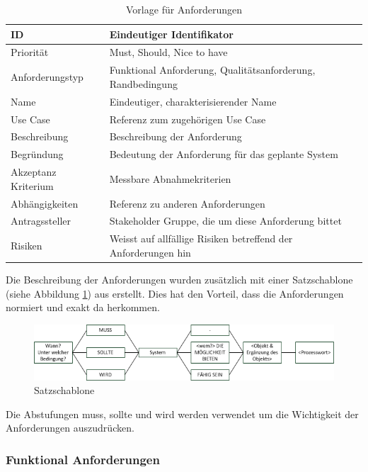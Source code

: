 \begin{table}[ht]
\centering
  \begin{tabular}{ l | p{8cm} }
	\hline
	\rowcolor{gray}
	ID 			&	Eindeutiger Identifikator\\ \hline
	Priorität 		&	Must, Should, Nice to have\\ \hline
	Anforderungstyp	&	Funktional Anforderung, Qualitätsanforderung, Randbedingung\\ \hline
	Name 			&	Eindeutiger, charakterisierender Name\\ \hline
	Use Case 		&	Referenz zum zugehörigen Use Case\\ \hline
	Beschreibung 	&	Beschreibung der Anforderung\\ \hline
	Begründung 		&	Bedeutung der Anforderung für das geplante System\\ \hline
	Akzeptanz Kriterium	&	Messbare Abnahmekriterien\\ \hline
	Abhängigkeiten 	&	Referenz zu anderen Anforderungen\\ \hline
	Antragssteller 	&	Stakeholder Gruppe, die um diese Anforderung bittet\\ \hline
	Risiken	 	&	Weisst auf allfällige Risiken betreffend der Anforderungen hin
  \end{tabular}
   \caption{Vorlage für Anforderungen}\label{table:req_template}
\end{table}


Die Beschreibung der Anforderungen wurden zusätzlich mit einer Satzschablone (siehe Abbildung \ref{fig:satzschablone}) aus \cite{req_eng_book} erstellt. Dies hat den Vorteil, dass die Anforderungen normiert und exakt da herkommen.
\begin{figure}[h]
\includegraphics{images/anforderungen/satzschablone.png}
\caption{Satzschablone}
\label{fig:satzschablone}
\end{figure}
\FloatBarrier
Die Abstufungen muss, sollte und wird werden verwendet um die Wichtigkeit der Anforderungen auszudrücken.

\newpage
\FloatBarrier
\subsubsection{Funktional Anforderungen}\label{func_anforderungen}

